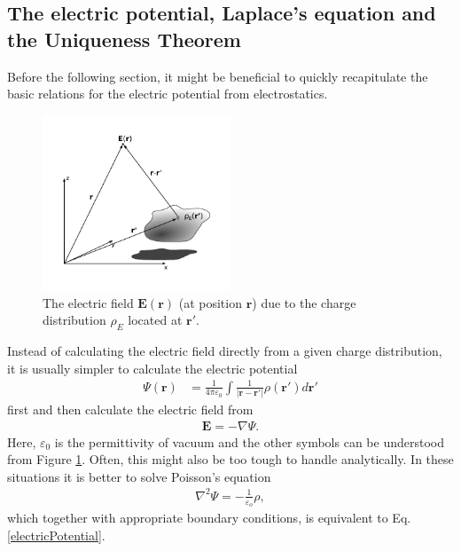 \subsection{The electric potential, Laplace's equation and the Uniqueness Theorem}
Before the following section, it might be beneficial to quickly recapitulate the basic relations
for the electric potential from electrostatics.
%
\begin{figure}[h!]
  \centering
   \includegraphics[width=0.5\textwidth]{Figures/electricFieldcoord.pdf}
   \caption{
      The electric field $\boldsymbol E (\boldsymbol r)$ (at position $\boldsymbol r$)
      due to the charge distribution $\rho_E$ located at $\boldsymbol{r'}$.
   }
   \label{fig:electricField}
\end{figure}
%
Instead of calculating the electric field directly from a given charge distribution, 
it is usually simpler to calculate the electric potential 
\begin{align}
   \label{electricPotential}
   \Psi(\boldsymbol{r}) 
   &= \frac{1}{4 \pi \varepsilon_0} \int \frac{1}{\big|\boldsymbol{r} - \boldsymbol{r'}\big|} 
                                                           \rho(\boldsymbol{r'}) d\!\boldsymbol{r'}
\end{align}
first and then calculate the electric field from
\begin{align}
   \boldsymbol{E} = - \nabla \Psi.
\end{align}
Here, $\varepsilon_0$ is the permittivity of vacuum and
the other symbols can be understood from Figure \ref{fig:electricField}.
Often, this might also be too tough to handle analytically.
In these situations it is better to solve Poisson's equation
\begin{align}
   \label{poisson}
   \nabla^2 \Psi= - \frac{1}{\varepsilon_o} \rho,
\end{align}
which together with appropriate boundary conditions, is equivalent to Eq.\eqref{electricPotential}.
